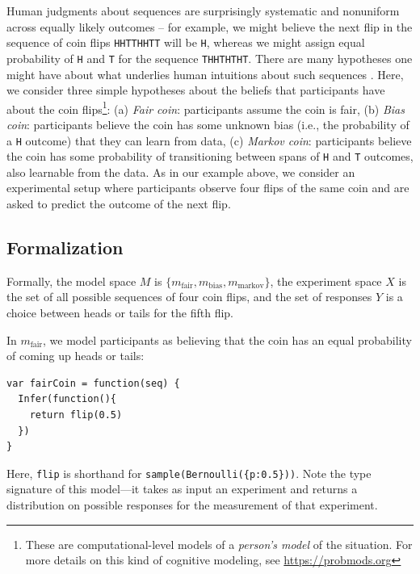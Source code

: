 \documentclass{article}
\begin{document}
Human judgments about sequences are surprisingly systematic and nonuniform across equally likely outcomes -- for example, we might believe the next flip in the  sequence of coin flips \lstinline{HHTTHHTT} will be \lstinline{H}, whereas we might assign equal probability of \lstinline{H} and \lstinline{T} for the sequence \lstinline{THHTHTHT}.
There are many hypotheses one might have about what underlies human intuitions about such sequences \cite{goodfellow38:jep, falk81:pme, Griffiths2004_nips}.
Here, we consider three simple hypotheses about the beliefs that participants have about the coin flips\footnote{These are computational-level models of a \emph{person's model} of the situation. For more details on this kind of cognitive modeling, see \url{https://probmods.org}}: (a) \emph{Fair coin}: participants assume the coin is fair, (b) \emph{Bias coin}: participants believe the coin has some unknown bias (i.e., the probability of a \lstinline{H} outcome) that they can learn from data, (c) \emph{Markov coin}: participants believe the coin has some probability of transitioning between spans of \lstinline{H} and \lstinline{T} outcomes, also learnable from the data.
As in our example above, we consider an experimental setup where participants observe four flips of the same coin and are asked to predict the outcome of the next flip.


\subsection{Formalization}

Formally, the model space $M$ is $\{m_{\text{fair}}, m_{\text{bias}}, m_{\text{markov}}\}$, the experiment space $X$ is the set of all possible sequences of four coin flips, and the set of responses $Y$ is a choice between heads or tails for the fifth flip.

In $m_{\text{fair}}$, we model participants as believing that the coin has an equal probability of coming up heads or tails:

\begin{lstlisting}[upquote=true]
var fairCoin = function(seq) {
  Infer(function(){
    return flip(0.5)
  })
}
\end{lstlisting}
Here, \lstinline{flip} is shorthand for \lstinline|sample(Bernoulli({p:0.5}))|.
Note the type signature of this model---it takes as input an experiment and returns a distribution on possible responses for the measurement of that experiment.
\end{document}
